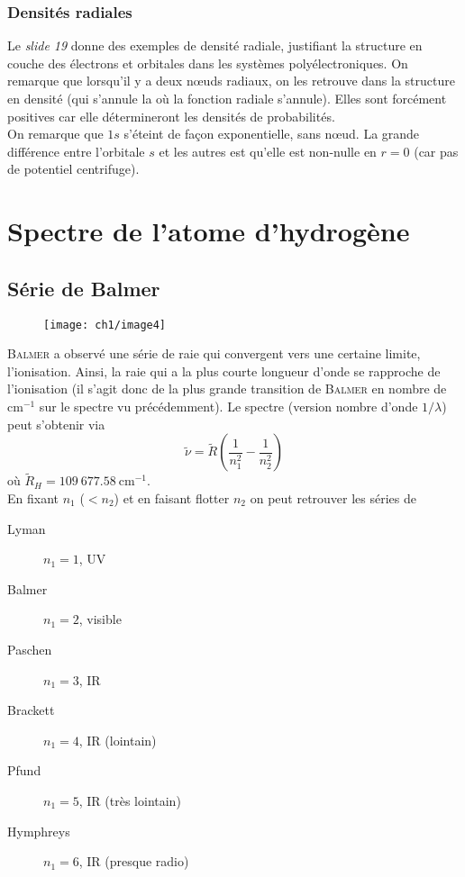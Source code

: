 \subsubsection{Densités radiales}
Le \textit{slide 19} donne des exemples de densité radiale, justifiant la structure en couche des 
électrons et orbitales dans les systèmes polyélectroniques. On remarque que lorsqu'il y a deux nœuds 
radiaux, on les retrouve dans la structure en densité (qui s'annule la où la fonction radiale s'annule). Elles
sont forcément positives car elle détermineront les densités de probabilités.\\

On remarque que $1s$ s'éteint de façon exponentielle, sans nœud. La grande différence entre l'orbitale $s$ et
les autres est qu'elle est non-nulle en $r=0$ (car pas de potentiel centrifuge).


\section{Spectre de l’atome d’hydrogène}

\subsection{Série de Balmer}
	\begin{wrapfigure}[12]{l}{8cm}
	\vspace{-5mm}
	\texttt{[image: ch1/image4]}
	\end{wrapfigure}
\textsc{Balmer} a observé une série de raie qui convergent vers une certaine limite, l'ionisation. Ainsi, la
raie qui a la plus courte longueur d'onde se rapproche de l'ionisation (il s'agit donc de la plus grande 
transition de \textsc{Balmer} en nombre de cm$^{-1}$ sur le spectre vu précédemment). Le spectre (version 
nombre d'onde $1/\lambda$) peut s'obtenir via
\begin{equation}
\tilde{\nu} = \tilde{R}\left(\frac{1}{n_1^2}-\frac{1}{n_2^2}\right)
\end{equation}
où $\tilde{R}_H = 109\ 677.58\ \text{cm}^{-1}$.\\

En fixant $n_1$ ($< n_2$) et en faisant flotter $n_2$ on peut retrouver les séries de
\begin{multicols}{2}
\begin{description}
\item[Lyman] $n_1=1$, UV
\item[Balmer] $n_1=2$, visible
\item[Paschen] $n_1=3$, IR
\item[Brackett] $n_1=4$, IR (lointain)
\item[Pfund] $n_1=5$, IR (très lointain)
\item[Hymphreys] $n_1=6$, IR (presque radio)
\end{description}
\end{multicols}


